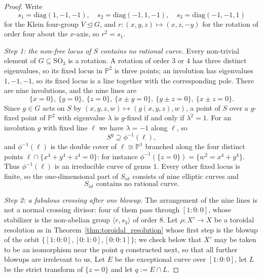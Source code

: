 \documentclass[11pt]{amsart}
\theoremstyle{plain}
\theoremstyle{definition}
\theoremstyle{remark}
\numberwithin{equation}{section}
\begin{document}
\begin{proof}
Write
\[
s_1 = \mathrm{diag}(1,-1,-1), \quad
s_2 = \mathrm{diag}(-1,1,-1), \quad
s_3 = \mathrm{diag}(-1,-1,1)
\]
for the Klein four-group $V \trianglelefteq G$, and
$r : (x,y,z) \mapsto (x,z,-y)$ for the rotation of order four about the
$x$-axis, so $r^2 = s_1$.

\emph{Step 1: the non-free locus of $S$ contains no rational curve.}
Every non-trivial element of $G \subseteq \mathrm{SO}_3$ is a rotation.  A
rotation of order $3$ or $4$ has three distinct eigenvalues, so its fixed
locus in $\mathbb{P}^2$ is three points; an involution has eigenvalues
$1,-1,-1$, so its fixed locus is a line together with the corresponding
pole.  There are nine involutions, and the nine lines are
\[
\{x = 0\},\ \{y=0\},\ \{z=0\},\ \{x \pm y = 0\},\ \{y \pm z = 0\},\
\{x \pm z = 0\} .
\]
Since $g \in G$ acts on $S$ by $(x,y,z,w) \mapsto (g(x,y,z), w)$, a point of
$S$ over a $g$-fixed point of $\mathbb{P}^2$ with eigenvalue $\lambda$ is
$g$-fixed if and only if $\lambda^2 = 1$.  For an involution $g$ with fixed
line $\ell$ we have $\lambda = -1$ along $\ell$, so
\[
S^g \supseteq \phi^{-1}(\ell) ,
\]
and $\phi^{-1}(\ell)$ is the double cover of $\ell \cong \mathbb{P}^1$
branched along the four distinct points $\ell \cap \{x^4+y^4+z^4 = 0\}$:
for instance $\phi^{-1}(\{z=0\}) = \{w^2 = x^4 + y^4\}$.  Thus
$\phi^{-1}(\ell)$ is an irreducible curve of genus $1$.  Every other fixed
locus is finite, so the one-dimensional part of $S_{nt}$ consists of nine
elliptic curves and
\[
S_{nt} \text{ contains no rational curve.}
\]

\emph{Step 2: a fabulous crossing after one blowup.}  The arrangement of
the nine lines is not a normal crossing divisor: four of them pass through
$[1:0:0]$, whose stabilizer is the non-abelian group
$\langle r, s_3 \rangle$ of order $8$.  Let $\rho : X' \to X$ be a toroidal
resolution as in Theorem~\ref{thm:toroidal_resolution} whose first step is
the blowup of the orbit $\{[1:0:0],[0:1:0],[0:0:1]\}$; we check below that
$X'$ may be taken to be an isomorphism near the point $q$ constructed next,
so that all further blowups are irrelevant to us.  Let $E$ be the
exceptional curve over $[1:0:0]$, let $L$ be the strict transform of
$\{z = 0\}$ and let $q := E \cap L$.


\end{proof}
\end{document}
